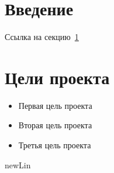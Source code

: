 \documentclass[11pt]{article}
\begin{document}
    \section{Введение}\label{sec:work}
    Ссылка на секцию~\ref{sec:work}

    \section{Цели проекта}\label{sec:points}
    \begin{itemize}
        \item Первая цель проекта
        \item Вторая цель проекта
        \item Третья цель проекта
    \end{itemize}
    newLin~\cite{conlan1983massive}

    
    
\end{document}
